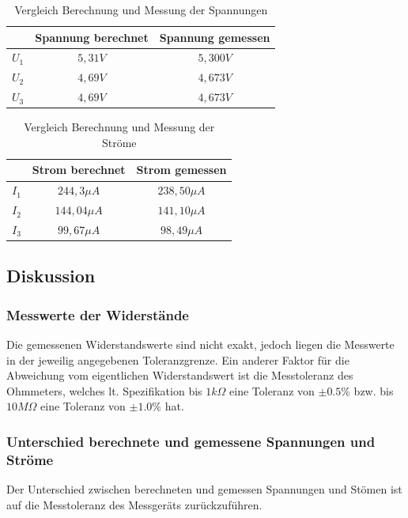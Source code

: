 \documentclass[12pt,a4paper,titlepage]{article}
\begin{document}
\begin{table}[H]
  \centering
  \begin{tabular}{|c|c|c|}
  \hline
  ~  & Spannung berechnet & Spannung gemessen \\ \hline
  $U_1$ & $5,31 V$             & $5,300 V$            \\ \hline
  $U_2$ & $4,69 V$             & $4,673 V$            \\ \hline
  $U_3$ & $4,69 V$             & $4,673 V$            \\ \hline
  \end{tabular}
  \caption{Vergleich Berechnung und Messung der Spannungen}
  \label{Figure3.3.4}
\end{table}

\begin{table}[H]
  \centering
  \begin{tabular}{|c|c|c|}
  \hline
  ~  & Strom berechnet & Strom gemessen \\ \hline
  $I_1$ & $244,3 \mu A$       & $238,50 \mu A$     \\ \hline
  $I_2$ & $144,04 \mu A$      & $141,10 \mu A$     \\ \hline
  $I_3$ & $99,67 \mu A$       & $98,49 \mu A$      \\ \hline
  \end{tabular}
  \caption{Vergleich Berechnung und Messung der Str\"ome}
  \label{Figure3.3.5}
\end{table}

\subsection{Diskussion}
\subsubsection{Messwerte der Widerst\"ande}
Die gemessenen Widerstandswerte sind nicht exakt, jedoch liegen die Messwerte in der jeweilig angegebenen Toleranzgrenze. Ein anderer Faktor f\"ur die Abweichung vom eigentlichen Widerstandswert ist die Messtoleranz des Ohmmeters, welches lt. Spezifikation bis $1k \Omega$ eine Toleranz von $\pm0.5\%$ bzw. bis $10 M\Omega$ eine Toleranz von $\pm1.0\%$ hat.

\subsubsection{Unterschied berechnete und gemessene Spannungen und Str\"ome}
Der Unterschied zwischen berechneten und gemessen Spannungen und St\"omen ist auf die Messtoleranz des Messger\"ats zur\"uckzuf\"uhren.
\end{document}
